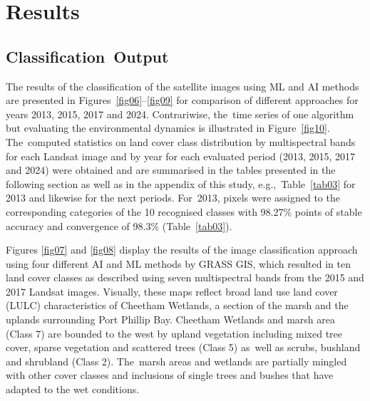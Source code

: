 \documentclass[jmse,article,accept,pdftex,oneauthor]{Definitions/mdpi}
\begin{document}
\section{Results}
\unskip

\subsection{Classification~Output}

{The results} of the classification of the satellite images using ML and AI methods are presented in Figures~\ref{fig06}--\ref{fig09} for comparison of different approaches for years 2013, 2015, 2017 and 2024. Contrariwise, the~time series of one algorithm but evaluating the environmental dynamics is illustrated in Figure~\ref{fig10}. The~computed statistics on land cover class distribution by multispectral bands for each Landsat image and by year for each evaluated period (2013, 2015, 2017 and 2024) {were} obtained and are summarised in the tables presented in the following section as well as in the appendix of this study, e.g.,~Table~\ref{tab03} for 2013 and likewise for the next periods. For~2013, pixels were assigned to the corresponding categories of the 10 recognised classes with 98.27\% points of %
stable accuracy and convergence of 98.3\% (Table~\ref{tab03}).

{Figures} \ref{fig07} and  \ref{fig08} {display the results of the image classification approach using four different AI and ML methods by GRASS GIS, which resulted in ten land cover classes as described using seven multispectral bands from the 2015 and 2017 Landsat images. Visually, these maps reflect broad land use land cover (LULC) characteristics of Cheetham Wetlands, a section of the marsh and the uplands surrounding Port Phillip Bay.} {Cheetham Wetlands and marsh area (Class 7) are bounded to the west by upland vegetation including mixed tree cover, sparse vegetation and scattered trees (Class 5) as~well as scrubs, bushland and shrubland (Class 2). The~marsh areas and wetlands are partially mingled with other cover classes and inclusions of single trees and bushes that have adapted %
	to the wet conditions. }
\end{document}
